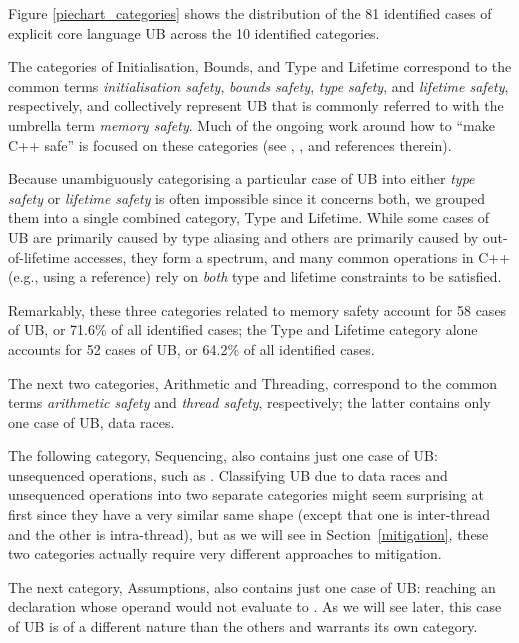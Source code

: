 Figure \ref{piechart_categories} shows the distribution of the 81 identified cases of explicit core language UB across the 10 identified categories. 



The categories of Initialisation, Bounds, and Type and Lifetime correspond to the common terms \emph{initialisation safety}, \emph{bounds safety}, \emph{type safety},  and \emph{lifetime safety}, respectively, and collectively represent UB that is commonly referred to with the umbrella term \emph{memory safety}. Much of the ongoing work around how to ``make C++ safe'' is focused on these  categories (see \cite{P3081R2}, \cite{P3700R0}, and references therein).

Because unambiguously categorising a particular case of UB into either \emph{type safety} or \emph{lifetime safety} is often impossible since it concerns both, we grouped them into a single combined category, Type and Lifetime. While some cases of UB are primarily caused by type aliasing and others are primarily caused by out-of-lifetime accesses, they form a spectrum, and many common operations in C++ (e.g., using a reference) rely on \emph{both} type and lifetime constraints to be satisfied.

Remarkably, these three categories related to memory safety account for 58 cases of UB, or 71.6\% of all identified cases; the Type and Lifetime category alone accounts for 52 cases of UB, or 64.2\% of all identified cases.

The next two categories, Arithmetic and Threading, correspond to the common terms \emph{arithmetic safety} and \emph{thread safety}, respectively; the latter contains only one case of UB, data races.

The following category, Sequencing, also contains just one case of UB: unsequenced operations, such as \mbox{}. Classifying UB due to data races and unsequenced operations into two separate categories might seem surprising at first since they have a very similar same shape (except that one is inter-thread and the other is intra-thread), but as we will see in Section~\ref{mitigation}, these two categories actually require very different approaches to mitigation.

The next category, Assumptions, also contains just one case of UB: reaching an \tcode{[[assume]]} declaration whose operand would not evaluate to . As we will see later, this case of UB is of a different nature than the others and warrants its own category.

